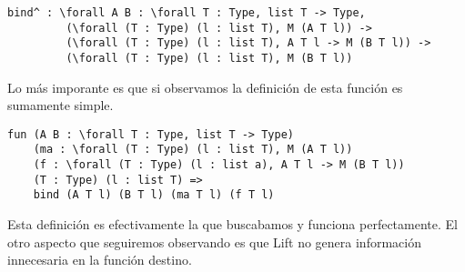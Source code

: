 \begin{lstlisting}
bind^ : \forall A B : \forall T : Type, list T -> Type,
         (\forall (T : Type) (l : list T), M (A T l)) ->
         (\forall (T : Type) (l : list T), A T l -> M (B T l)) ->
         (\forall (T : Type) (l : list T), M (B T l))
\end{lstlisting}

Lo más imporante es que si observamos la definición de esta función es sumamente simple.

\begin{lstlisting}
fun (A B : \forall T : Type, list T -> Type)
    (ma : \forall (T : Type) (l : list T), M (A T l))
    (f : \forall (T : Type) (l : list a), A T l -> M (B T l))
    (T : Type) (l : list T) =>
    bind (A T l) (B T l) (ma T l) (f T l)
\end{lstlisting}

Esta definición es efectivamente la que buscabamos y funciona perfectamente.
El otro aspecto que seguiremos observando es que Lift no genera información innecesaria en la función destino.
\fi